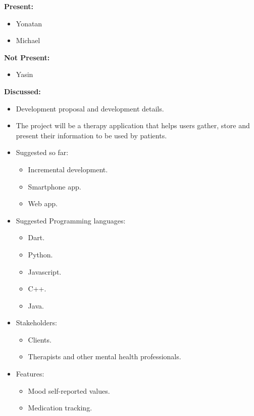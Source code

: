 \documentclass[11pt]{article}
\begin{document}
    \textbf{Present:}
    \begin{itemize}
        \item Yonatan
        \item Michael
    \end{itemize}

    \textbf{Not Present:}

    \begin{itemize}
        \item Yasin
    \end{itemize}

    \textbf{Discussed:}

    \begin{itemize}
        \item  Development proposal and development details.
        \item  The project will be a therapy application that helps users gather, store and present their information to be used by patients.
        \item Suggested so far:
        \begin{itemize}
            \item Incremental development.
            \item Smartphone app.
            \item Web app.
        \end{itemize}
        \item  Suggested Programming languages:
        \begin{itemize}
            \item Dart.
            \item Python.
            \item Javascript.
            \item C++.
            \item Java.
        \end{itemize}
        \item Stakeholders:
        \begin{itemize}
            \item Clients.
            \item Therapists and other mental health professionals.
        \end{itemize}
        \item Features:
        \begin{itemize}
            \item Mood self-reported values.
            \item Medication tracking.
        \end{itemize}

    \end{itemize}
\end{document}

